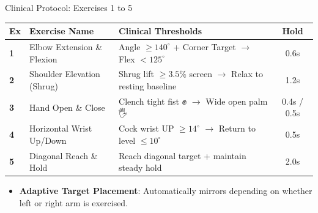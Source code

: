 \documentclass{beamer}
\begin{document}
\begin{frame}{Clinical Protocol: Exercises 1 to 5}
\begin{table}[]
\centering
\small
\begin{tabular}{lp{3.5cm}p{3.5cm}c}
\toprule
\textbf{Ex} & \textbf{Exercise Name} & \textbf{Clinical Thresholds} & \textbf{Hold} \\
\midrule
\textbf{1} & Elbow Extension \& Flexion & Angle $\ge 140^\circ$ + Corner Target $\rightarrow$ Flex $< 125^\circ$ & 0.6s \\
\textbf{2} & Shoulder Elevation (Shrug) & Shrug lift $\ge 3.5\%$ screen $\rightarrow$ Relax to resting baseline & 1.2s \\
\textbf{3} & Hand Open \& Close & Clench tight fist ✊ $\rightarrow$ Wide open palm 🖐️ & 0.4s / 0.5s \\
\textbf{4} & Horizontal Wrist Up/Down & Cock wrist UP $\ge 14^\circ$ $\rightarrow$ Return to level $\le 10^\circ$ & 0.5s \\
\textbf{5} & Diagonal Reach \& Hold & Reach diagonal target + maintain steady hold & 2.0s \\
\bottomrule
\end{tabular}
\end{table}
\begin{itemize}
    \item \textbf{Adaptive Target Placement}: Automatically mirrors depending on whether left or right arm is exercised.
\end{itemize}
\end{frame}
\end{document}
